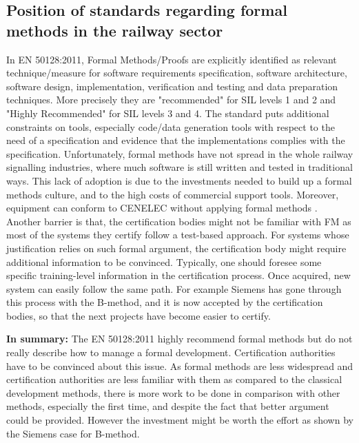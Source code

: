 \documentclass{template/openetcs_report}
\begin{document}
\subsection{Position of standards regarding formal methods in the railway sector}
In EN 50128:2011, Formal Methods/Proofs are explicitly identified as relevant technique/measure for software requirements specification, software architecture, software design, implementation, verification and testing and data preparation techniques. More precisely they are "recommended" for SIL levels 1 and 2 and "Highly Recommended" for SIL levels 3 and 4. The standard puts additional constraints on tools, especially code/data generation tools with respect to the need of a specification and evidence that the implementations complies with the specification. 
Unfortunately, formal methods have not spread in the whole railway signalling industries, where much software is still written and tested in traditional ways. This lack of adoption is due to the investments needed to build up a formal methods culture, and to the high costs of commercial support tools. Moreover, equipment can conform to CENELEC without applying formal methods \cite{Proc-doc}. 
Another barrier is that, the certification bodies might not be familiar with FM as most of the systems they certify follow a test-based approach. For systems whose justification relies on such formal argument, the certification body might require additional information to be convinced. Typically, one should foresee some specific training-level information in the certification process. Once acquired, new system can easily follow the same path. \linebreak \linebreak For example Siemens has gone through this process with the B-method, and it is now accepted by the certification bodies, so that the next projects have become easier to certify. 

\textbf{In summary:} The EN 50128:2011 highly recommend formal methods but do not really describe how to manage a formal development. Certification authorities have to be convinced about this issue. 
As formal methods are less widespread and certification authorities are less familiar with them as compared to the classical development methods, there is more work to be done in comparison with other methods, especially the first time, and despite the fact that better argument could be provided. However the investment might be worth the effort as shown by the Siemens case for B-method. 
\end{document}

